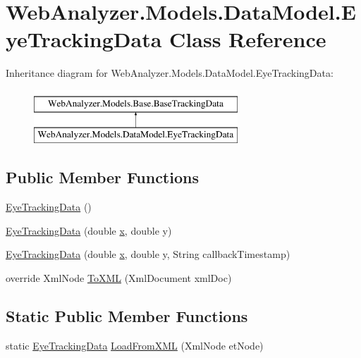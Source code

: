 \hypertarget{class_web_analyzer_1_1_models_1_1_data_model_1_1_eye_tracking_data}{}\section{Web\+Analyzer.\+Models.\+Data\+Model.\+Eye\+Tracking\+Data Class Reference}
\label{class_web_analyzer_1_1_models_1_1_data_model_1_1_eye_tracking_data}
Inheritance diagram for Web\+Analyzer.\+Models.\+Data\+Model.\+Eye\+Tracking\+Data\+:\begin{figure}[H]
\begin{center}
\leavevmode
\includegraphics[height=2.000000cm]{class_web_analyzer_1_1_models_1_1_data_model_1_1_eye_tracking_data}
\end{center}
\end{figure}
\subsection*{Public Member Functions}
\begin{DoxyCompactItemize}
\item 
\hyperlink{class_web_analyzer_1_1_models_1_1_data_model_1_1_eye_tracking_data_a019976267c787cca233fa585617604a9}{Eye\+Tracking\+Data} ()
\item 
\hyperlink{class_web_analyzer_1_1_models_1_1_data_model_1_1_eye_tracking_data_a70772188385fd52208012f521b681587}{Eye\+Tracking\+Data} (double \hyperlink{_u_i_2_h_t_m_l_resources_2js_2lib_2underscore_8min_8js_a81e910173af87b1161e719a504d52407}{x}, double y)
\item 
\hyperlink{class_web_analyzer_1_1_models_1_1_data_model_1_1_eye_tracking_data_ab19e82540642c30ffdcc165b614f1484}{Eye\+Tracking\+Data} (double \hyperlink{_u_i_2_h_t_m_l_resources_2js_2lib_2underscore_8min_8js_a81e910173af87b1161e719a504d52407}{x}, double y, String callback\+Timestamp)
\item 
override Xml\+Node \hyperlink{class_web_analyzer_1_1_models_1_1_data_model_1_1_eye_tracking_data_a1c9442c2b205d50095519102069ad2cd}{To\+X\+M\+L} (Xml\+Document xml\+Doc)
\end{DoxyCompactItemize}
\subsection*{Static Public Member Functions}
\begin{DoxyCompactItemize}
\item 
static \hyperlink{class_web_analyzer_1_1_models_1_1_data_model_1_1_eye_tracking_data}{Eye\+Tracking\+Data} \hyperlink{class_web_analyzer_1_1_models_1_1_data_model_1_1_eye_tracking_data_a8b4193887c838834858386d84b2cbc1b}{Load\+From\+X\+M\+L} (Xml\+Node et\+Node)
\end{DoxyCompactItemize}
